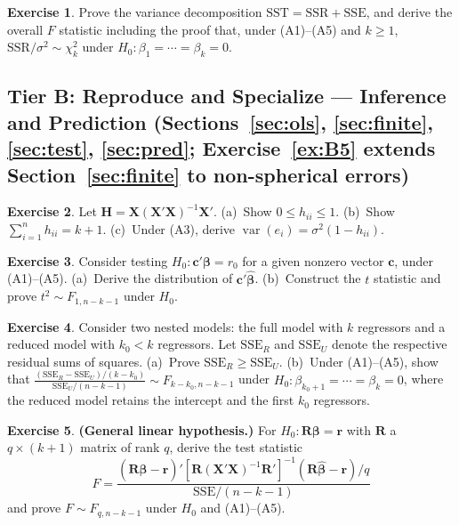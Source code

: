 \documentclass[12pt,a4paper]{article}
\theoremstyle{definition}
\newtheorem{exercise}{Exercise}
\newcommand{\extier}{}
\newcommand{\exercisetier}[1]{\renewcommand{\extier}{#1}\setcounter{exercise}{0}}
\DeclareMathOperator\var{var}
\newcommand{\SST}{\mathrm{SST}}
\newcommand{\SSR}{\mathrm{SSR}}
\newcommand{\SSE}{\mathrm{SSE}}
\newcommand{\bX}{\mathbf{X}}
\def\bb{\boldsymbol{\beta}}
\newcommand{\bH}{\mathbf{H}}
\newcommand{\bR}{\mathbf{R}}
\newcommand{\br}{\mathbf{r}}
\def\bc{\mathbf{c}}
\begin{document}
\begin{exercise}\label{ex:A11}
Prove the variance decomposition $\SST = \SSR + \SSE$, and derive the overall $F$ statistic including the proof that, under (A1)--(A5) and $k \geqslant 1$, $\SSR/\sigma^2 \sim \chi^2_k$ under $H_0\colon \beta_1 = \cdots = \beta_k = 0$.
\end{exercise}

\exercisetier{B}
\subsection*{Tier B: Reproduce and Specialize --- Inference and Prediction (Sections~\ref{sec:ols}, \ref{sec:finite}, \ref{sec:test}, \ref{sec:pred}; Exercise~\ref{ex:B5} extends Section~\ref{sec:finite} to non-spherical errors)}

\begin{exercise}\label{ex:B1}
Let $\bH = \bX(\bX'\bX)^{-1}\bX'$. (a)~Show $0 \leqslant h_{ii} \leqslant 1$. (b)~Show $\sum_{i=1}^n h_{ii} = k+1$. (c)~Under (A3), derive $\var(e_i) = \sigma^2(1-h_{ii})$.
\end{exercise}

\begin{exercise}\label{ex:B2}
Consider testing $H_0\colon \bc'\bb = r_0$ for a given nonzero vector $\bc$, under (A1)--(A5). (a)~Derive the distribution of $\bc'\hat{\bb}$. (b)~Construct the $t$ statistic and prove $t^2 \sim F_{1, n-k-1}$ under $H_0$.
\end{exercise}

\begin{exercise}\label{ex:B3}
Consider two nested models: the full model with $k$ regressors and a reduced model with $k_0 < k$ regressors. Let $\SSE_R$ and $\SSE_U$ denote the respective residual sums of squares. (a)~Prove $\SSE_R \geqslant \SSE_U$. (b)~Under (A1)--(A5), show that $\frac{(\SSE_R - \SSE_U)/(k-k_0)}{\SSE_U/(n-k-1)} \sim F_{k-k_0, n-k-1}$ under $H_0\colon \beta_{k_0+1} = \cdots = \beta_k = 0$, where the reduced model retains the intercept and the first $k_0$ regressors.
\end{exercise}

\begin{exercise}\label{ex:B4}
\textbf{(General linear hypothesis.)} For $H_0\colon \bR\bb = \br$ with $\bR$ a $q\times(k+1)$ matrix of rank $q$, derive the test statistic
\[
F = \frac{(\bR\hat{\bb} - \br)'[\bR(\bX'\bX)^{-1}\bR']^{-1}(\bR\hat{\bb} - \br)/q}{\SSE/(n-k-1)}
\]
and prove $F \sim F_{q, n-k-1}$ under $H_0$ and (A1)--(A5).
\end{exercise}
\end{document}
